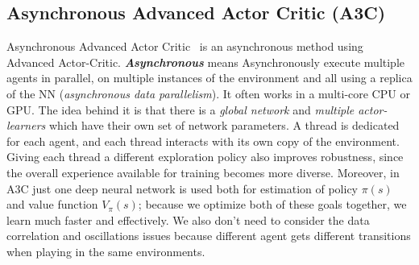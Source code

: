 \subsection{Asynchronous Advanced Actor Critic (\textbf{A3C})}
Asynchronous Advanced Actor Critic~\parencite{mnih2016asynchronous} is an asynchronous method using Advanced Actor-Critic. \textit{\textbf{Asynchronous}} means Asynchronously execute multiple agents in parallel, on multiple instances of the environment and all using a replica of the NN (\textit{asynchronous data parallelism}). It often works in a multi-core CPU or GPU. The idea behind it is that there is a \textit{global network} and \textit{multiple actor-learners} which have their own set of network parameters. A thread is dedicated for each agent, and each thread interacts with its own copy of the environment.
Giving each thread a different exploration policy also improves robustness, since the overall experience available for training becomes more diverse. Moreover, in A3C just one deep neural network is used both for estimation of policy $\pi(s)$ and value function $V_{\pi}(s)$; because we optimize both of these goals together, we learn much faster and effectively. We also don’t need to consider the data correlation and oscillations issues because different agent gets different transitions when playing in the same environments.



